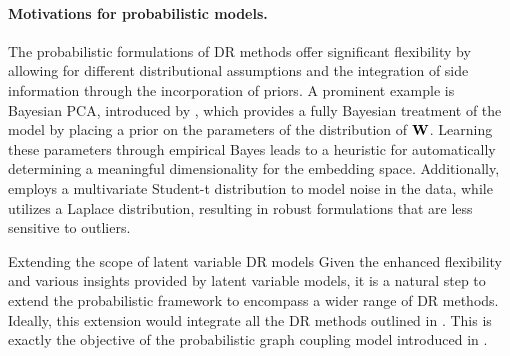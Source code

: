 \paragraph{Motivations for probabilistic models.}  
The probabilistic formulations of DR methods offer significant flexibility by allowing for different distributional assumptions and the integration of side information through the incorporation of priors. A prominent example is Bayesian PCA, introduced by \cite{bishop1998bayesian}, which provides a fully Bayesian treatment of the model by placing a prior on the parameters of the distribution of ${\mathbf{W}}$. Learning these parameters through empirical Bayes leads to a heuristic for automatically determining a meaningful dimensionality for the embedding space. Additionally, \cite{zhao2006probabilistic} employs a multivariate Student-t distribution to model noise in the data, while \cite{wang2012probabilistic} utilizes a Laplace distribution, resulting in robust formulations that are less sensitive to outliers.

\vspace{0.5cm}
\begin{prob}{Extending the scope of latent variable DR models}\label{prob:probabilistic_models}
    Given the enhanced flexibility and various insights provided by latent variable models, it is a natural step to extend the probabilistic framework to encompass a wider range of DR methods. Ideally, this extension would integrate all the DR methods outlined in . This is exactly the objective of the probabilistic graph coupling model introduced in .
\end{prob}
\vspace{0.5cm}
